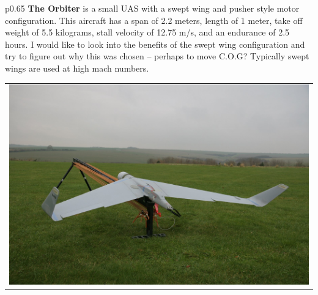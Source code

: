 \documentclass[]{article}
\begin{document}
\begin{table}[H]
\begin{minipage}[b]{0.65\linewidth}
\begin{tabular}{*{1}{p{0.65\textwidth}}}
{\bf The Orbiter} is a small UAS with a swept wing and pusher style motor configuration.  This aircraft has a span of 2.2 meters, length of 1 meter, take off weight of 5.5 kilograms, stall velocity of 12.75 m/s, and an endurance of 2.5 hours.  I would like to look into the benefits of the swept wing configuration and try to figure out why this was chosen -- perhaps to move C.O.G? Typically swept wings are used at high mach numbers.
\end{tabular}
\end{minipage}
\hfill
\begin{minipage}[b]{0.5\linewidth}
\begin{tabular}{*{1}{p{}}}
\includegraphics[height=8\baselineskip]{orbiter}
\end{tabular}
\end{minipage}
\end{table}
\end{document}
